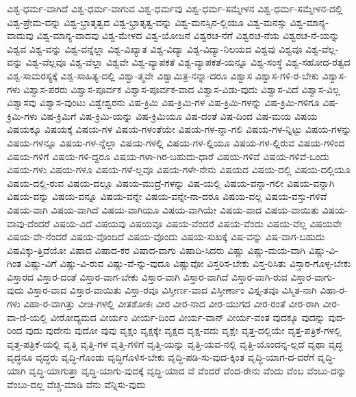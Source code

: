 {ವಿಶ್ವ-ಧರ್ಮ-ವಾಗಿದೆ
ವಿಶ್ವ-ಧರ್ಮ-ವಾಗುವ
ವಿಶ್ವ-ಧರ್ಮವು
ವಿಶ್ವ-ಧರ್ಮ-ಸಮ್ಮೇಳನ
ವಿಶ್ವ-ಧರ್ಮ-ಸಮ್ಮೇಳನ-ದಲ್ಲಿ
ವಿಶ್ವ-ಪ್ರೇಮ-ವನ್ನು
ವಿಶ್ವ-ಭ್ರಾತೃತ್ವದ
ವಿಶ್ವ-ಭ್ರಾತೃತ್ವ-ವನ್ನು
ವಿಶ್ವ-ಮನಸ್ಸಿನ-ಲ್ಲಿಯೂ
ವಿಶ್ವ-ಮನಸ್ಸು
ವಿಶ್ವ-ಮಾನ್ಯ-ವಾದುವು
ವಿಶ್ವ-ಮಾನ್ಯ-ವಾದವು
ವಿಶ್ವ-ಮೇಳದ
ವಿಶ್ವ-ಯೋಜನೆ
ವಿಶ್ವರಚ-ನೆಗೆ
ವಿಶ್ವರಚ-ನೆಯ
ವಿಶ್ವರಚ-ನೆ-ಯನ್ನು
ವಿಶ್ವವ
ವಿಶ್ವ-ವನ್ನು
ವಿಶ್ವ-ವನ್ನೆಲ್ಲಾ
ವಿಶ್ವ-ವಿಖ್ಯಾತ
ವಿಶ್ವ-ವಿದ್ಯಾ
ವಿಶ್ವ-ವಿದ್ಯಾ-ನಿಲಯದ
ವಿಶ್ವವು
ವಿಶ್ವವೂ
ವಿಶ್ವ-ವೆಲ್ಲ-ವನ್ನು
ವಿಶ್ವ-ವೆಲ್ಲವೂ
ವಿಶ್ವ-ವೆಲ್ಲಾ
ವಿಶ್ವವೇ
ವಿಶ್ವ-ವ್ಯಾಪಕತೆ
ವಿಶ್ವ-ವ್ಯಾಪಕತೆ-ಯನ್ನೂ
ವಿಶ್ವ-ಸಂಸ್ಥೆ
ವಿಶ್ವ-ಸಹೋದ-ರತ್ವದ
ವಿಶ್ವ-ಸಾಮರಸ್ಯಕ್ಕೆ
ವಿಶ್ವ-ಸಾಹಿತ್ಯ-ದಲ್ಲಿ
ವಿಶ್ವಾ-ತ್ಮವೇ
ವಿಶ್ವಾಮಿತ್ರ-ನನ್ನಾ-ದರೂ
ವಿಶ್ವಾಸ
ವಿಶ್ವಾಸ-ಗಳಿ-ರ-ಬೇಕು
ವಿಶ್ವಾಸ-ಗಳು
ವಿಶ್ವಾಸ-ಪರರು
ವಿಶ್ವಾಸ-ಪೂರ್ವಕ
ವಿಶ್ವಾಸ-ಪೂರ್ವಕ-ವಾದ
ವಿಶ್ವಾಸ-ವಿಡು-ವುದು
ವಿಶ್ವಾಸ-ವಿದೆ
ವಿಶ್ವಾಸ-ವಿಲ್ಲ
ವಿಶ್ವಾಸವು
ವಿಶ್ವಾಸ-ವುಂಟು
ವಿಶ್ವೇಶ್ವರನು
ವಿಷ-ಕ್ರಿಮಿ
ವಿಷ-ಕ್ರಿಮಿ-ಗಳ
ವಿಷ-ಕ್ರಿಮಿ-ಗಳನ್ನು
ವಿಷ-ಕ್ರಿಮಿ-ಗಳಿಗೂ
ವಿಷ-ಕ್ರಿಮಿ-ಗಳು
ವಿಷ-ಕ್ರಿಮಿಗೆ
ವಿಷ-ಕ್ರಿಮಿ-ಯನ್ನು
ವಿಷ-ಕ್ರಿಮಿಯೂ
ವಿಷ-ದಂತೆ
ವಿಷ-ದಿಂದ
ವಿಷ-ಮಯ
ವಿಷಯ
ವಿಷಯಕ್ಕೂ
ವಿಷಯಕ್ಕೆ
ವಿಷಯ-ಗಳ
ವಿಷಯ-ಗಳಂತೆಯೇ
ವಿಷಯ-ಗಳ-ನ್ನಾ-ಗಲಿ
ವಿಷಯ-ಗಳ-ನ್ನಿಟ್ಟು
ವಿಷಯ-ಗಳನ್ನು
ವಿಷಯ-ಗಳನ್ನೂ
ವಿಷಯ-ಗಳ-ನ್ನೆಲ್ಲಾ
ವಿಷಯ-ಗಳಲ್ಲಿ
ವಿಷಯ-ಗಳ-ಲ್ಲಿಯೂ
ವಿಷಯ-ಗಳ-ಲ್ಲಿರುವ
ವಿಷಯ-ಗಳಿಂದ
ವಿಷಯ-ಗಳಿಗೆ
ವಿಷಯ-ಗಳಿ-ದ್ದರೂ
ವಿಷಯ-ಗಳಾ-ಗಿರ-ಬಹುದು-ಧಾರೆ
ವಿಷಯ-ಗಳಿವೆ
ವಿಷಯ-ಗಳಿವೆ-ಒಂದು
ವಿಷಯ-ಗಳು
ವಿಷಯ-ಗಳೂ
ವಿಷಯ-ಗಳೆ-ಲ್ಲವೂ
ವಿಷಯ-ಗಳೇ-ನೇನು
ವಿಷಯದ
ವಿಷಯ-ದಲ್ಲಿ
ವಿಷಯ-ದಲ್ಲಿಯೂ
ವಿಷಯ-ದಲ್ಲಿ-ರುವ
ವಿಷಯ-ದಲ್ಲೂ
ವಿಷಯ-ಮುದ್ರೆ-ಗಳನ್ನು
ವಿಷ-ಯಲ್ಲಿ
ವಿಷಯ-ವನ್ನಾ-ಗಲೀ
ವಿಷಯ-ವನ್ನಾಗಿ
ವಿಷಯ-ವನ್ನು
ವಿಷಯ-ವನ್ನೂ
ವಿಷಯ-ವನ್ನೇ
ವಿಷಯ-ವನ್ನೇ-ನಾ-ದರೂ
ವಿಷಯ-ವಲ್ಲ
ವಿಷಯ-ವಸ್ತು-ಗಳಿವೆ
ವಿಷಯ-ವಾಗಿ
ವಿಷಯ-ವಾಗಿದೆ
ವಿಷಯ-ವಾಗಿಯೂ
ವಿಷಯ-ವಾಗಿಯೇ
ವಿಷಯ-ವಾದ
ವಿಷಯ-ವಾಯಿತು
ವಿಷಯ-ವಾವು-ದೆಂದರೆ
ವಿಷಯ-ವಿದೆ
ವಿಷಯವು
ವಿಷಯವೂ
ವಿಷಯ-ವೆಂದರೆ
ವಿಷಯ-ವೆಂದು
ವಿಷಯ-ವೆಲ್ಲ
ವಿಷಯವೇ
ವಿಷಯ-ವೇ-ನೆಂದರೆ
ವಿಷಯ-ವೊಂದಿದೆ
ವಿಷಯ-ವೊಂದು
ವಿಷಯ-ಸುಖಕ್ಕೆ
ವಿಷ-ವನ್ನು
ವಿಷ-ವಾಗ-ಬಹುದು
ವಿಷವಿಕ್ಕು-ತ್ತಿದೆಯೋ
ವಿಷಾದ
ವಿಷಾದ-ಕರ
ವಿಷಾದ-ವಾಗು
ವಿಷಾದಿ-ಸಿದರು
ವಿಷ್ಣು
ವಿಷ್ಣು-ಮಯ-ವಾಗಿ
ವಿಷ್ಣು-ವಿ-ಗಿಂತ
ವಿಷ್ಣು-ವಿಗೆ
ವಿಷ್ಣು-ವಿ-ರುವ
ವಿಷ್ಣು-ವೆ-ನ್ನು-ವುದೂ
ವಿಷ್ಣುವೋ
ವಿಸ್ತರಿಸ-ಬೇಕು
ವಿಸ್ತ-ರಿಸಿತು
ವಿಸ್ತಾರ-ಗೊಳ್ಳ-ಬೇಕು
ವಿಸ್ತಾರದ
ವಿಸ್ತಾರ-ದಂತೆ
ವಿಸ್ತಾರ-ವಾಗ-ಬೇಕು
ವಿಸ್ತಾರ-ವಾಗಿ
ವಿಸ್ತಾರ-ವಾಗಿದೆ
ವಿಸ್ತಾರ-ವಾಗಿ-ರುವ
ವಿಸ್ತಾರ-ವಾಗು-ವುದು
ವಿಸ್ತಾರ-ವಾದ
ವಿಸ್ತಾರ-ವಾಯಿತು
ವಿಸ್ತಾ-ರವೂ
ವಿಸ್ತೀರ್ಣ-ವಾದ
ವಿಸ್ತೀರ್ಣಾಂ
ವಿಸ್ತೃ-ತವೂ
ವಿಸ್ಮಿತ-ನಾಗಿ
ವಿಹಾ-ರ-ಗಳು
ವಿಹಾ-ರ-ವಾಗಿತ್ತು
ವೀಚಿ-ಗಳಲ್ಲಿ
ವೀತಶೋಕಃ
ವೀರ
ವೀರ-ನಾದ
ವೀರ-ಯುಗದ
ವೀರ-ರಂತೆ
ವೀರ-ರಾಗಿ
ವೀರ-ವಾ-ಣಿ-ಯಲ್ಲಿ
ವೀರೋದ್ಯಮದ
ವೀರ್ಯಂ
ವೀರ್ಯ-ದಿಂದ
ವೀರ್ಯ-ವಾನ್
ವೀರ್ಯ-ವಂತ
ವುದಕ್ಕೂ
ವುದನ್ನು
ವುದ-ರಿಂದ
ವುದು
ವುದೇನು
ವುದೋ
ವುವು
ವೃಕ್ಷಂ
ವೃಕ್ಷಕ್ಕೇ
ವೃಕ್ಷದ
ವೃಕ್ಷ-ವದು
ವೃಕ್ಷೇ
ವೃತ್ತ-ದಲ್ಲಿಯೇ
ವೃತ್ತ-ಪತ್ರಿಕೆ-ಗಳಲ್ಲಿ
ವೃತ್ತ-ಪತ್ರಿಕೆ-ಯಲ್ಲಿ
ವೃತ್ತಿ
ವೃತ್ತಿ-ಗಳ
ವೃತ್ತಿ-ಗಳಿಗೆ
ವೃತ್ತಿ-ಯನ್ನು
ವೃತ್ತಿ-ಯವ-ನಲ್ಲಿ
ವೃತ್ತಿ-ಯೊಂದನ್ನ-ಲ್ಲದೆ
ವೃಥಾ
ವೃದ್ಧ
ವೃದ್ಧನೂ
ವೃದ್ಧರು
ವೃದ್ಧಿ-ಗೊಂಡು
ವೃದ್ಧಿಗೊಳಿಸ-ಬೇಕು
ವೃದ್ಧಿ-ಪಡಿ-ಸು-ವುದ-ಕ್ಕಿಂತ
ವೃದ್ಧಿ-ಯಾಗ-ದ-ವರೆಗೆ
ವೃದ್ಧಿ-ಯಾಗಿ
ವೃದ್ಧಿ-ಯಾಗುತ್ತಾ
ವೃದ್ಧಿ-ಯಾಗು-ವುದಕ್ಕೆ
ವೃದ್ಧಿ-ಯಾದ
ವೆ
ವೆಂದರೆ
ವೆಂದ-ರೇನು
ವೆಂದು
ವೆಂಬ
ವೆಂಬು-ದನ್ನು
ವೆಂಬು-ದಲ್ಲ
ವೆಚ್ಚ-ಮಾಡಿ
ವೆನು
ವೆನ್ನಿಸು-ವುದು
}
